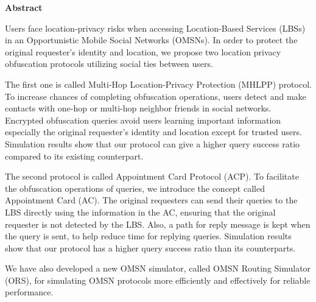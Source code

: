 
\begin{center}\textbf{Abstract}\end{center}

\noindent Users face location-privacy risks when accessing Location-Based Services (LBSs) in an Opportunistic Mobile Social Networks (OMSNs). In order to protect the original requester's identity and location, we propose two location privacy obfuscation protocols utilizing social ties between users.

The first one is called Multi-Hop Location-Privacy Protection (MHLPP) protocol. To increase chances of completing obfuscation operations, users detect and make contacts with one-hop or multi-hop neighbor friends in social networks. Encrypted obfuscation queries avoid users learning important information especially the original requester's identity and location except for trusted users. Simulation results show that our protocol can give a higher query success ratio compared to its existing counterpart. 

The second protocol is called Appointment Card Protocol (ACP). To facilitate the obfuscation operations of queries, we introduce the concept called Appointment Card (AC). The original requesters can send their queries to the LBS directly using the information in the AC, ensuring that the original requester is not detected by the LBS. Also, a path for reply message is kept when the query is sent, to help reduce time for replying queries. Simulation results show that our protocol has a higher query success ratio than its counterparts.

We have also developed a new OMSN simulator, called OMSN Routing Simulator (ORS), for simulating OMSN protocols more efficiently and effectively for reliable performance.

\cleardoublepage

